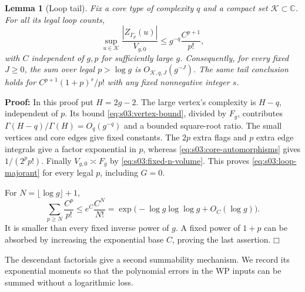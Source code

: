 \documentclass[a4paper,10pt]{article}
\numberwithin{equation}{section}
\theoremstyle{paperplain}
\newtheorem{lmm}[thm]{Lemma}
\theoremstyle{paperremark}
\theoremstyle{paperplain}
\newenvironment{prf}{\noindent \textbf{Proof: }}{\hfill $\mdlgwhtsquare$\par\addvspace{0.5\baselineskip}}
\begin{document}
\begin{lmm}[Loop tail]
\label{lmm:s03:loop-tail}
Fix a core type of complexity $q$ and a compact set
$\mathcal K\subset\mathbb C$. For all its legal loop counts,
\begin{equation}
\label{eq:s03:loop-majorant}
\sup_{u\in\mathcal K}
 \frac{|Z_{\Gamma_p}(u)|}{V_{g,0}}
\leq g^{-q}\frac{C^{p+1}}{p!},
\end{equation}
with $C$ independent of $g,p$ for sufficiently large $g$.
Consequently, for every fixed $J\geq0$, the sum over legal
$p>\log g$ is $O_{\mathcal K,q,J}(g^{-J})$.
The same tail conclusion holds for $C^{p+1}(1+p)^s/p!$ with any
fixed nonnegative integer $s$.
\end{lmm}
\begin{prf}
In this proof put $H=2g-2$. The large vertex's complexity is
$H-q$, independent of $p$. Its bound
\eqref{eq:s03:vertex-bound}, divided by $F_g$, contributes
$\Gamma(H-q)/\Gamma(H)=O_q(g^{-q})$ and a bounded square-root
ratio. The small vertices and core edges give fixed constants.
The $2p$ extra flags and $p$ extra edge integrals give a factor
exponential in $p$, whereas \eqref{eq:s03:core-automorphisms}
gives $1/(2^pp!)$. Finally $V_{g,0}\asymp F_g$ by
\eqref{eq:s03:fixed-n-volume}. This proves
\eqref{eq:s03:loop-majorant} for every legal $p$, including $G=0$.

For $N=\lfloor\log g\rfloor+1$,
\[
\sum_{p\geq N}\frac{C^p}{p!}
\leq e^C\frac{C^N}{N!}
=\exp\bigl(-\log g\log\log g+O_C(\log g)\bigr).
\]
It is smaller than every fixed inverse power of $g$.
A fixed power of $1+p$ can be absorbed by increasing the exponential
base $C$, proving the last assertion.
\end{prf}

The descendant factorials give a second summability mechanism. We
record its exponential moments so that the polynomial errors in
the WP inputs can be summed without a logarithmic loss.
\end{document}
